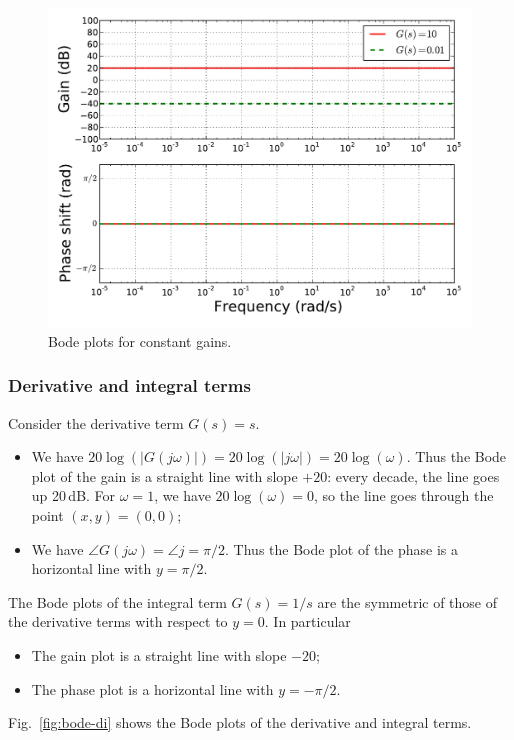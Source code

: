 \documentclass[a4paper,11pt]{report}
\theoremstyle{definition}
\begin{document}
\begin{figure}[H]
  \centering
  \includegraphics[width=12cm]{fig/bode-const.pdf}
  \caption{Bode plots for constant gains.}
  \label{fig:bode-const}
\end{figure}

\subsubsection{Derivative and integral terms}

Consider the derivative term $G(s)=s$. 
\begin{itemize}
\item We have
  $20\log(|G(j\omega)|)=20\log(|j\omega|)=20\log(\omega)$. Thus
  the Bode plot of the gain is a straight line with slope $+20$: every
  decade, the line goes up 20\,dB. For $\omega=1$, we have
  $20\log(\omega)=0$, so the line goes through the point
  $(x,y)=(0,0)$;
\item We have $\angle G(j\omega)=\angle j=\pi/2$. Thus the Bode plot
  of the phase is a horizontal line with $y=\pi/2$.
\end{itemize}

The Bode plots of the integral term $G(s)=1/s$ are the symmetric of
those of the derivative terms with respect to $y=0$. In particular
\begin{itemize}
\item The gain plot is a straight line with slope $-20$;
\item The phase plot is a horizontal line with $y=-\pi/2$.
\end{itemize}

Fig.~\ref{fig:bode-di} shows the Bode plots of the derivative and
integral terms.
\end{document}
